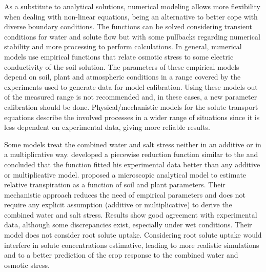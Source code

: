 As a substitute to analytical solutions, numerical modeling allows more flexibility when dealing with non-linear equations, being an alternative to better cope with diverse boundary conditions. 
The functions can be solved considering transient conditions for water and solute flow but with some pullbacks regarding numerical stability and more processing to perform calculations.
In general, numerical models use empirical functions that relate osmotic stress to some electric conductivity of the soil solution. 
The parameters of these empirical models depend on soil, plant and atmospheric conditions in a range covered by the experiments used to generate data for model calibration. 
Using these models out of the measured range is not recommended and, in these cases, a new parameter calibration should be done.
Physical/mechanistic models for the solute transport equations describe the involved processes in a wider range of situations since it is less dependent on experimental data, giving more reliable results.


Some models treat the combined water and salt stress neither in an additive or in a multiplicative way. 
\cite{homaee} developed a piecewise reduction function similar to the \cite{feddes78} and concluded that the function fitted his experimental data better than any additive or multiplicative model.
\cite{liersolute} proposed a microscopic analytical model to estimate relative transpiration as a function of soil and plant parameters. 
Their mechanistic approach reduces the need of empirical parameters and does not require any explicit assumption (additive or multiplicative) to derive the combined water and salt stress. 
Results show good agreement with experimental data, although some discrepancies exist, especially under wet conditions. 
Their model does not consider root solute uptake.
Considering root solute uptake would interfere in solute concentrations estimative, leading to more realistic simulations and to a better prediction of the crop response to the combined water and osmotic stress.

